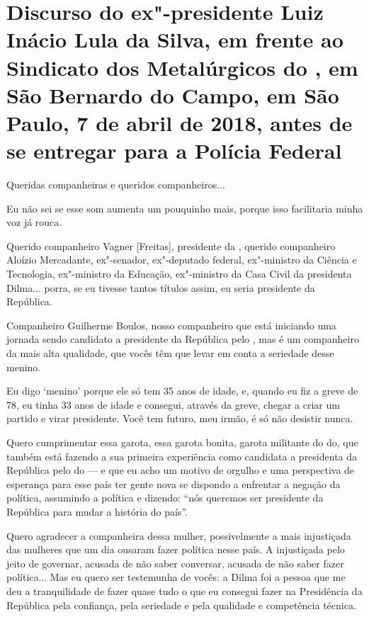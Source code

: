 \chapter*{Discurso do ex"-presidente Luiz Inácio Lula da Silva, em frente ao
Sindicato dos Metalúrgicos do , em São Bernardo do Campo, em São
Paulo, 7 de abril de 2018, antes de se entregar para a Polícia Federal}


Queridas companheiras e queridos companheiros...

Eu não sei se esse som aumenta um pouquinho mais, porque isso
facilitaria minha voz já rouca.

Querido companheiro Vagner [Freitas], presidente da ,
querido companheiro Aloízio Mercadante, ex"-senador, ex"-deputado federal,
ex"-ministro da Ciência e Tecnologia, ex"-ministro da Educação,
ex"-ministro da Casa Civil da presidenta Dilma... porra, se eu tivesse
tantos títulos assim, eu seria presidente da República.

Companheiro Guilherme Boulos, nosso companheiro que está iniciando
uma jornada sendo candidato a presidente da República pelo , mas é
um companheiro da mais alta qualidade, que vocês têm que levar em conta
a seriedade desse menino.

Eu digo `menino' porque ele só tem 35 anos de idade, e, quando eu
fiz a greve de 78, eu tinha 33 anos de idade e consegui, através da
greve, chegar a criar um partido e virar presidente. Você tem futuro,
meu irmão, é só não desistir nunca.

Quero cumprimentar essa garota, essa garota bonita, garota
militante do do, que também está fazendo a sua primeira experiência
como candidata a presidenta da República pelo do --- e que eu acho
um motivo de orgulho e uma perspectiva de esperança para esse país ter
gente nova se dispondo a enfrentar a negação da política, assumindo a
política e dizendo: ``nós queremos ser presidente da República para mudar
a história do país''.

Quero agradecer a companheira dessa mulher, possivelmente a mais
injustiçada das mulheres que um dia ousaram fazer política nesse país. A
injustiçada pelo jeito de governar, acusada de não saber conversar,
acusada de não saber fazer política... Mas eu quero ser testemunha de
vocês: a Dilma foi a pessoa que me deu a tranquilidade de fazer quase
tudo o que eu consegui fazer na Presidência da República pela confiança,
pela seriedade e pela qualidade e competência técnica.

